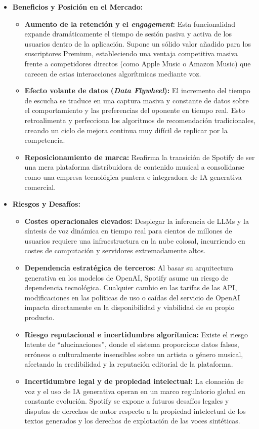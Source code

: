 \documentclass[12pt,a4paper]{article}
\begin{document}
\begin{itemize}
    \item \textbf{Beneficios y Posición en el Mercado:} 
    \begin{itemize}
        \item \textbf{Aumento de la retención y el \textit{engagement}:} Esta funcionalidad expande dramáticamente el tiempo de sesión pasiva y activa de los usuarios dentro de la aplicación. Supone un sólido valor añadido para los suscriptores Premium, estableciendo una ventaja competitiva masiva frente a competidores directos (como Apple Music o Amazon Music) que carecen de estas interacciones algorítmicas mediante voz.
        \item \textbf{Efecto volante de datos (\textit{Data Flywheel}):} El incremento del tiempo de escucha se traduce en una captura masiva y constante de datos sobre el comportamiento y las preferencias del oponente en tiempo real. Esto retroalimenta y perfecciona los algoritmos de recomendación tradicionales, creando un ciclo de mejora continua muy difícil de replicar por la competencia.
        \item \textbf{Reposicionamiento de marca:} Reafirma la transición de Spotify de ser una mera plataforma distribuidora de contenido musical a consolidarse como una empresa tecnológica puntera e integradora de IA generativa comercial.
    \end{itemize}
    
    \item \textbf{Riesgos y Desafíos:}
    \begin{itemize}
        \item \textbf{Costes operacionales elevados:} Desplegar la inferencia de LLMs y la síntesis de voz dinámica en tiempo real para cientos de millones de usuarios requiere una infraestructura en la nube colosal, incurriendo en costes de computación y servidores extremadamente altos.
        \item \textbf{Dependencia estratégica de terceros:} Al basar su arquitectura generativa en los modelos de OpenAI, Spotify asume un riesgo de dependencia tecnológica. Cualquier cambio en las tarifas de las API, modificaciones en las políticas de uso o caídas del servicio de OpenAI impacta directamente en la disponibilidad y viabilidad de su propio producto.
        \item \textbf{Riesgo reputacional e incertidumbre algorítmica:} Existe el riesgo latente de ``alucinaciones'', donde el sistema proporcione datos falsos, erróneos o culturalmente insensibles sobre un artista o género musical, afectando la credibilidad y la reputación editorial de la plataforma.
        \item \textbf{Incertidumbre legal y de propiedad intelectual:} La clonación de voz y el uso de IA generativa operan en un marco regulatorio global en constante evolución. Spotify se expone a futuros desafíos legales y disputas de derechos de autor respecto a la propiedad intelectual de los textos generados y los derechos de explotación de las voces sintéticas.
    \end{itemize}
\end{itemize}
\end{document}
